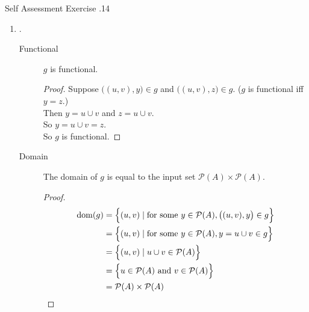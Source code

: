 \documentclass[../notes.tex]{subfiles}
\begin{document}
\begin{exercise}{Self Assessment Exercise \thechapter.14}
\begin{enumerate}
\begin{enumerate}[label=(\alph*)]
\begin{description}
											\begin{proof} \moveup
												\begin{align*}
													\mathrm{dom}(f) &= \{x \mid \text{for some } y \in \mathcal{P}(A), (x, y) \in f\}\\
													&= \{x \mid \text{for some } y \in \mathcal{P}(A), y = x'\}\\
													&= \{x \mid x' \in \mathcal{P}(A)\}\\
													&= \mathcal{P}(A) \qedhere
												\end{align*}
											\end{proof}
									\end{description}
								\item {}.
									\begin{description}
										\item[Functional] $g$ is functional.
											\begin{proof}
												Suppose $\bigl((u, v), y\bigr) \in g$ and $\bigl((u, v), z\bigr) \in g$. ($g$ is functional iff $y = z$.)\\
												Then $y = u \cup v$ and $z = u \cup v$.\\
												So $y = u \cup v = z$.\\
												So $g$ is functional.
											\end{proof}
										\item[Domain] The domain of $g$ is equal to the input set $\mathcal{P}(A) \times \mathcal{P}(A)$.
											\begin{proof} \moveup
												\begin{align*}
													\mathrm{dom}(g) &= \Bigl\{(u, v) \mid \text{for some } y \in \mathcal{P}(A), \bigl((u, v), y\bigr) \in g\Bigr\}\\
													&= \Bigl\{(u, v) \mid \text{for some } y \in \mathcal{P}(A), y = u \cup v \in g\Bigr\}\\
													&= \Bigl\{(u, v) \mid u \cup v \in \mathcal{P}(A)\Bigr\}\\
													&= \Bigl\{u \in \mathcal{P}(A) \text{ and } v \in \mathcal{P}(A)\Bigr\}\\
													&= \mathcal{P}(A) \times \mathcal{P}(A) \qedhere
												\end{align*}
											\end{proof}
									\end{description}

\end{enumerate}
\end{enumerate}
\end{exercise}
\end{document}
